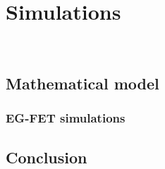 \chapter{Simulations}
\label{cap:chapter5}

\newpage
\thispagestyle{empty}
\ %
\newpage


\section{Mathematical model}
\label{sec:model}




\subsection{EG-FET simulations}
\label{sec:EGFET_simulations}


\section{Conclusion}


\newpage
\thispagestyle{empty}
\ %
\newpage